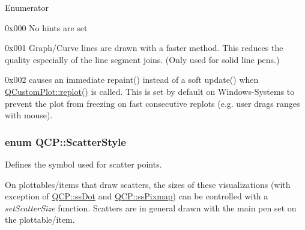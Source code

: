 \begin{Desc}
\item[Enumerator]\par
\begin{description}
\item[{\em 
\hypertarget{namespaceQCP_a5400e5fcb9528d92002ddb938c1f4ef4ab7283c5bfc1ba9e597015389880bda42}{ph\-None}\label{namespaceQCP_a5400e5fcb9528d92002ddb938c1f4ef4ab7283c5bfc1ba9e597015389880bda42}
}]{\ttfamily 0x000} No hints are set \item[{\em 
\hypertarget{namespaceQCP_a5400e5fcb9528d92002ddb938c1f4ef4aa5fd227bc878c56ad2a87ea32c74ee4d}{ph\-Fast\-Polylines}\label{namespaceQCP_a5400e5fcb9528d92002ddb938c1f4ef4aa5fd227bc878c56ad2a87ea32c74ee4d}
}]{\ttfamily 0x001} Graph/\-Curve lines are drawn with a faster method. This reduces the quality especially of the line segment joins. (Only used for solid line pens.) \item[{\em 
\hypertarget{namespaceQCP_a5400e5fcb9528d92002ddb938c1f4ef4aa3090dafa0e0f9a28c579c79d6c2d283}{ph\-Force\-Repaint}\label{namespaceQCP_a5400e5fcb9528d92002ddb938c1f4ef4aa3090dafa0e0f9a28c579c79d6c2d283}
}]{\ttfamily 0x002} causes an immediate repaint() instead of a soft update() when \hyperlink{classQCustomPlot_a563540b54b2a09c8ef092d42e9621f42}{Q\-Custom\-Plot\-::replot()} is called. This is set by default on Windows-\/\-Systems to prevent the plot from freezing on fast consecutive replots (e.\-g. user drags ranges with mouse). \end{description}
\end{Desc}
\hypertarget{namespaceQCP_af66d0711d42fe78d96c28abadc67f26f}{
\subsubsection[{Scatter\-Style}]{\setlength{\rightskip}{0pt plus 5cm}enum {\bf Q\-C\-P\-::\-Scatter\-Style}}}\label{namespaceQCP_af66d0711d42fe78d96c28abadc67f26f}
Defines the symbol used for scatter points.

On plottables/items that draw scatters, the sizes of these visualizations (with exception of \hyperlink{namespaceQCP_af66d0711d42fe78d96c28abadc67f26fa56816c1386f1356417bcc013adf0367c}{Q\-C\-P\-::ss\-Dot} and \hyperlink{namespaceQCP_af66d0711d42fe78d96c28abadc67f26fa3046d385199d0903dd492322ba133e75}{Q\-C\-P\-::ss\-Pixmap}) can be controlled with a {\itshape set\-Scatter\-Size} function. Scatters are in general drawn with the main pen set on the plottable/item.

